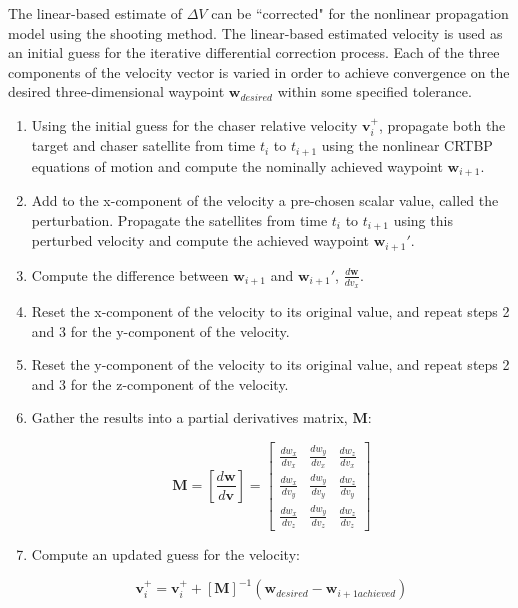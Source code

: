 \documentclass[]{article}
\begin{document}
The linear-based estimate of \(\Delta V\) can be ``corrected" for the nonlinear propagation model using the shooting method.  The linear-based estimated velocity is used as an initial guess for the iterative differential correction process.  Each of the three components of the velocity vector is varied in order to achieve convergence on the desired three-dimensional waypoint \(\mathbf{w}_{desired}\) within some specified tolerance.

\begin{enumerate}[leftmargin=!,labelindent=12pt,itemindent=0pt, label=Step \arabic*:]

	\item Using the initial guess for the chaser relative velocity \(\mathbf{v}_i^+\), propagate both the target and chaser satellite from time \(t_i\) to \(t_{i+1}\) using the nonlinear CRTBP equations of motion and compute the nominally achieved waypoint \(\mathbf{w}_{i+1}\).
	
	\item Add to the x-component of the velocity a pre-chosen scalar value, called the perturbation.  Propagate the satellites from time \(t_i\) to \(t_{i+1}\) using this perturbed velocity and compute the achieved waypoint \(\mathbf{w}_{i+1}'\).
	
	\item Compute the difference between \(\mathbf{w}_{i+1}\) and \(\mathbf{w}_{i+1}'\), \(\frac{d\mathbf{w}}{dv_x}\).
	
	\item Reset the x-component of the velocity to its original value, and repeat steps 2 and 3 for the y-component of the velocity.
	
	\item Reset the y-component of the velocity to its original value, and repeat steps 2 and 3 for the z-component of the velocity.
	
	\item Gather the results into a partial derivatives matrix, \(\mathbf{M}\):
	
	\begin{equation} \label{eq:ShootingMethodPartialDerivs}
	\mathbf{M} = \left[ \frac{d\mathbf{w}}{d\mathbf{v}} \right]
	= \begin{bmatrix}
	\frac{dw_x}{dv_x} & \frac{dw_y}{dv_x} & \frac{dw_z}{dv_x} \\[0.3em]
	\frac{dw_x}{dv_y} & \frac{dw_y}{dv_y} & \frac{dw_z}{dv_y} \\[0.3em]
	\frac{dw_x}{dv_z} & \frac{dw_y}{dv_z} & \frac{dw_z}{dv_z}
	\end{bmatrix}
	\end{equation}
	
	\item Compute an updated guess for the velocity:
	
	\begin{equation} \label{eq:ShootingMethodUpdate}
	\mathbf{v}_i^+ = \mathbf{v}_i^+ + [\mathbf{M}]^{-1}(\mathbf{w}_{desired} - \mathbf{w}_{i+1 achieved})
	\end{equation}
	
\end{enumerate}
\end{document}
